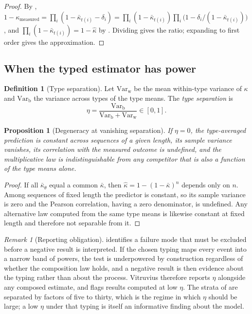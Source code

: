\documentclass[11pt,twocolumn,a4paper]{article}
\theoremstyle{thmstyle}
\newtheorem{proposition}[theorem]{Proposition}
\theoremstyle{definition}
\newtheorem{definition}[theorem]{Definition}
\theoremstyle{remark}
\newtheorem{remark}[theorem]{Remark}
\newcommand{\kap}{\kappa}
\begin{document}
\begin{proof}
By ,
$1-\kap_{\mathrm{measured}}=\prod_i(1-\bar\kap_{t(i)}-\delta_i)
=\prod_i(1-\bar\kap_{t(i)})\prod_i\bigl(1-\delta_i/(1-\bar\kap_{t(i)})\bigr)$,
and $\prod_i(1-\bar\kap_{t(i)})=1-\hat\kap$ by .
Dividing gives the ratio; expanding to first order gives the approximation.
\end{proof}

\subsection{When the typed estimator has power}

\begin{definition}[Type separation]
\label{def:eta}
Let $\mathrm{Var}_{\mathrm{w}}$ be the mean within-type variance of $\kap$ and
$\mathrm{Var}_{\mathrm{b}}$ the variance across types of the type means. The
\emph{type separation} is
\[
\eta=\frac{\mathrm{Var}_{\mathrm{b}}}
{\mathrm{Var}_{\mathrm{b}}+\mathrm{Var}_{\mathrm{w}}}\in[0,1].
\]
\end{definition}

\begin{proposition}[Degeneracy at vanishing separation]
\label{prop:degeneracy}
If $\eta=0$, the type-averaged prediction is constant across sequences of a
given length, its sample variance vanishes, its correlation with the measured
outcome is undefined, and the multiplicative law is indistinguishable from any
competitor that is also a function of the type means alone.
\end{proposition}

\begin{proof}
If all $\bar\kap_{\theta}$ equal a common $\bar\kap$, then
$\hat\kap=1-(1-\bar\kap)^{n}$ depends only on $n$. Among sequences of fixed
length the predictor is constant, so its sample variance is zero and the
Pearson correlation, having a zero denominator, is undefined. Any alternative
law computed from the same type means is likewise constant at fixed length and
therefore not separable from it.
\end{proof}

\begin{remark}[Reporting obligation]
\label{rem:report-eta}
 identifies a failure mode that must be excluded before
a negative result is interpreted. If the chosen typing maps every event into a
narrow band of powers, the test is underpowered by construction regardless of
whether the composition law holds, and a negative result is then evidence
about the typing rather than about the process. Vitruvius therefore reports
$\eta$ alongside any composed estimate, and flags results computed at low
$\eta$. The strata of  are separated by factors of five to
thirty, which is the regime in which $\eta$ should be large; a low $\eta$ under
that typing is itself an informative finding about the model.
\end{remark}
\end{document}
